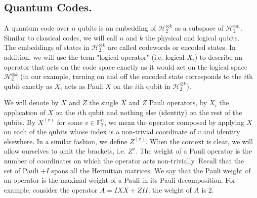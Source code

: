 \documentclass[manuscript,screen,review]{acmart}
\begin{document}
{\subsection{Quantum Codes.} \label{sec:quantum} A quantum code over $n$ qubits is an embedding of $\mathcal{H}_{2}^{\otimes k}$ as a subspace of $\mathcal{H}_{2}^{\otimes n}$. Similar to classical codes, we will call $n$ and $k$ the physical and logical qubits. The embeddings of states in $\mathcal{H}_{2}^{\otimes k}$ are called codewords or encoded states. In addition, we will use the term "logical operator" (i.e. logical $X_{i}$) to describe an operator that acts on the code space exactly as it would act on the logical space $\mathcal{H}_{2}^{\otimes k}$ (in our example, turning on and off the encoded state corresponds to the $i$th qubit exactly as $X_{i}$ acts as Pauli $X$ on the $i$th qubit in $\mathcal{H}_{2}^{\otimes k}$). 

We will denote by $X$ and $Z$ the single $X$ and $Z$ Pauli operators, by $X_{i}$ the application of $X$ on the $i$th qubit and nothing else (identity) on the rest of the qubits. By $X^{(v)}$ for some $v \in \mathbb{F}_{2}^{n}$, we mean the operator composed by applying $X$ on each of the qubits whose index is a non-trivial coordinate of $v$ and identity elsewhere. In a similar fashion, we define $Z^{(v)}$. When the context is clear, we will allow ourselves to omit the brackets, i.e. $Z^{v}$. The weight of a Pauli operator is the number of coordinates on which the operator acts non-trivially. Recall that the set of Pauli $+ I$ spans all the Hermitian matrices. We say that the Pauli weight of an operator is the maximal weight of a Pauli in its Pauli decomposition. For example, consider the operator $A = IXX + ZII$, the weight of $A$ is $2$.

}
\end{document}
